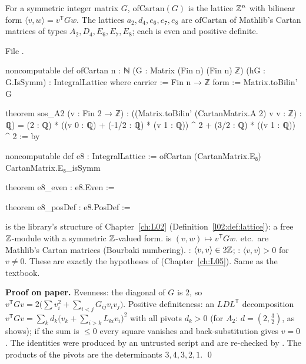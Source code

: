 \begin{definition}\label{l23:def:cartanlattice}
For a symmetric integer matrix $G$, $\mathrm{ofCartan}(G)$ is the lattice ${\mathbb{Z}}^n$ with bilinear form $\langle v,w\rangle=v^{\mathsf T}Gw$.
The lattices $a_2,d_4,e_6,e_7,e_8$ are $\mathrm{ofCartan}$ of Mathlib's Cartan matrices of types $A_2,D_4,E_6,E_7,E_8$; each is even and
positive definite.
\end{definition}
\noindent File .
\begin{leancode}
noncomputable def ofCartan {n : ℕ} (G : Matrix (Fin n) (Fin n) ℤ) (hG : G.IsSymm) :
    IntegralLattice where
  carrier := Fin n → ℤ
  form := Matrix.toBilin' G

theorem sos_A2 (v : Fin 2 → ℤ) :
    ((Matrix.toBilin' (CartanMatrix.A 2) v v : ℤ) : ℚ) =
      (2 : ℚ) * ((v 0 : ℚ) + (-1/2 : ℚ) * (v 1 : ℚ)) ^ 2 + (3/2 : ℚ) * ((v 1 : ℚ)) ^ 2 := by

noncomputable def e8 : IntegralLattice := ofCartan (CartanMatrix.E₈) CartanMatrix.E₈_isSymm

theorem e8_even : e8.Even :=

theorem e8_posDef : e8.PosDef :=
\end{leancode}

\begin{dictionary}
 is the library's structure of Chapter~\ref{ch:L02} (Definition~\ref{l02:def:lattice}): a free ${\mathbb{Z}}$-module
 with a symmetric ${\mathbb{Z}}$-valued form.  is $(v,w)\mapsto v^{\mathsf T}Gw$.  etc.\
are Mathlib's Cartan matrices (Bourbaki numbering). : $\langle v,v\rangle\in2{\mathbb{Z}}$; : $\langle v,v\rangle>0$ for
$v\ne0$. These are exactly the hypotheses of \lean{latticeVOAGen} (Chapter~\ref{ch:L05}). Same as the textbook.
\end{dictionary}

\textbf{Proof on paper.} Evenness: the diagonal of $G$ is $2$, so $v^{\mathsf T}Gv=2\big(\sum v_i^2+\sum_{i<j}G_{ij}v_iv_j\big)$.
Positive definiteness: an $LDL^{\mathsf T}$ decomposition $v^{\mathsf T}Gv=\sum_kd_k\big(v_k+\sum_{i>k}L_{ki}v_i\big)^2$ with all
pivots $d_k>0$ (for $A_2$: $d=(2,\tfrac32)$, as \lean{sos_A2} shows); if the sum is $\le0$ every square vanishes and back-substitution gives
$v=0$. The identities were produced by an untrusted script and are re-checked by \lean{ring}. The products of the pivots are the
determinants $3,4,3,2,1$. \qed


